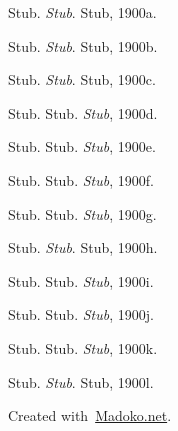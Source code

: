 \documentclass[preprint]{{sigplanconf}}
\begin{document}
{%
\begin{thebibliography}{12}%
\label{sec-bibliography}%

\mdbibitemlabel{}Stub.
\newblock  \emph{Stub}.
\newblock  Stub, 1900a.\label{clang}%

\mdbibitemlabel{}Stub.
\newblock  \emph{Stub}.
\newblock  Stub, 1900b.\label{cite}%

\mdbibitemlabel{}Stub.
\newblock  \emph{Stub}.
\newblock  Stub, 1900c.\label{forth}%

\mdbibitemlabel{}Stub.
\newblock  Stub.
\newblock  \emph{Stub}, 1900d.\label{leftfold}%

\mdbibitemlabel{}Stub.
\newblock  Stub.
\newblock  \emph{Stub}, 1900e.\label{liebniz}%

\mdbibitemlabel{}Stub.
\newblock  Stub.
\newblock  \emph{Stub}, 1900f.\label{lisp}%

\mdbibitemlabel{}Stub.
\newblock  Stub.
\newblock  \emph{Stub}, 1900g.\label{lua}%

\mdbibitemlabel{}Stub.
\newblock  \emph{Stub}.
\newblock  Stub, 1900h.\label{scheme}%

\mdbibitemlabel{}Stub.
\newblock  Stub.
\newblock  \emph{Stub}, 1900i.\label{self}%

\mdbibitemlabel{}Stub.
\newblock  Stub.
\newblock  \emph{Stub}, 1900j.\label{shapiro:effecttyping}%

\mdbibitemlabel{}Stub.
\newblock  Stub.
\newblock  \emph{Stub}, 1900k.\label{typescript}%

\mdbibitemlabel{}Stub.
\newblock  \emph{Stub}.
\newblock  Stub, 1900l.\label{unixshell}%
\par%
\end{thebibliography}}%

\begin{mdbmargintb}{4em}{}%
\begin{mdflushright}%
{\tiny Created with~\href{https://www.madoko.net}{Madoko.net}.}%
\end{mdflushright}%
\end{mdbmargintb}%
\end{document}

